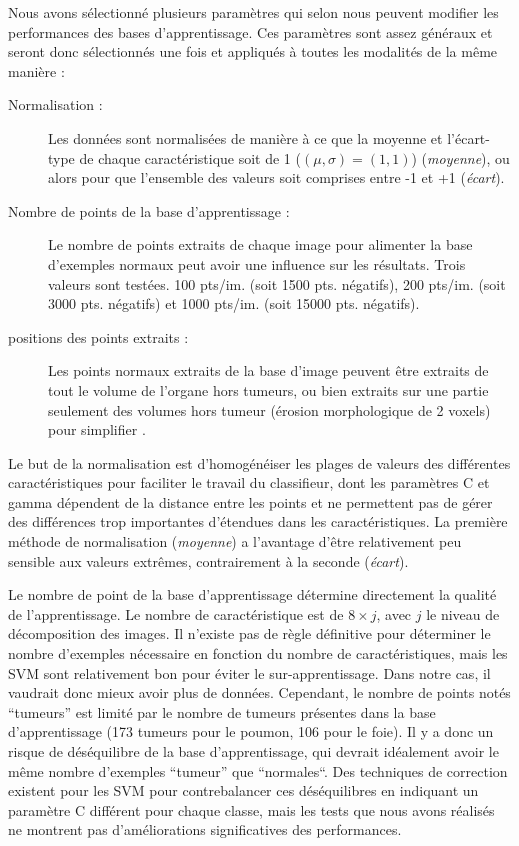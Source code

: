 Nous avons sélectionné plusieurs paramètres qui selon nous peuvent modifier les performances des bases d'apprentissage. Ces paramètres sont assez généraux et seront donc sélectionnés une fois et appliqués à toutes les modalités de la même manière :

\begin{description}
 \item[Normalisation :] Les données sont normalisées de manière à ce que la moyenne et l'écart-type de chaque caractéristique soit de 1 ($(\mu, \sigma)=(1,1)$) (\emph{moyenne}), ou alors pour que l'ensemble des valeurs soit comprises entre -1 et +1 (\emph{écart}).
 \item[Nombre de points de la base d'apprentissage :] Le nombre de points extraits de chaque image pour alimenter la base d'exemples normaux peut avoir une influence sur les résultats. Trois valeurs sont testées. 100 pts/im. (soit 1500 pts. négatifs), 200 pts/im. (soit 3000 pts. négatifs) et 1000 pts/im. (soit 15000 pts. négatifs).
 \item[positions des points extraits :] Les points normaux extraits de la base d'image peuvent être extraits de tout le volume de l'organe hors tumeurs, ou bien extraits sur une partie seulement des volumes hors tumeur (érosion morphologique de 2 voxels) pour simplifier .
\end{description}

Le but de la normalisation est d'homogénéiser les plages de valeurs des différentes caractéristiques pour faciliter le travail du classifieur, dont les paramètres C et gamma dépendent de la distance entre les points et ne permettent pas de gérer des différences trop importantes d'étendues dans les caractéristiques. La première méthode de normalisation (\emph{moyenne}) a l'avantage d'être relativement peu sensible aux valeurs extrêmes, contrairement à la seconde (\emph{écart}).

Le nombre de point de la base d'apprentissage détermine directement la qualité de l'apprentissage. Le nombre de caractéristique est de $8 \times j$, avec $j$ le niveau de décomposition des images. Il n'existe pas de règle définitive pour déterminer le nombre d'exemples nécessaire en fonction du nombre de caractéristiques, mais les SVM sont relativement bon pour éviter le sur-apprentissage. Dans notre cas, il vaudrait donc mieux avoir plus de données. Cependant, le nombre de points notés ``tumeurs'' est limité par le nombre de tumeurs présentes dans la base d'apprentissage (173 tumeurs pour le poumon, 106 pour le foie). Il y a donc un risque de déséquilibre de la base d'apprentissage, qui devrait idéalement avoir le même nombre d'exemples ``tumeur'' que ``normales``. Des techniques de correction existent pour les SVM pour contrebalancer ces déséquilibres en indiquant un paramètre C différent pour chaque classe, mais les tests que nous avons réalisés ne montrent pas d'améliorations significatives des performances.

